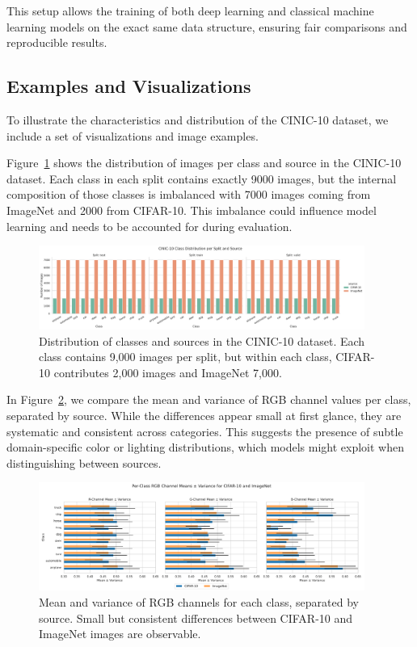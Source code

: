 This setup allows the training of both deep learning and classical machine learning models on the exact same data structure, ensuring fair 
comparisons and reproducible results.

\subsection{Examples and Visualizations}
\label{subsec:Examples and Visualizations}

To illustrate the characteristics and distribution of the CINIC-10 dataset, we include a set of visualizations and image examples.

Figure~\ref{fig:class-distribution} shows the distribution of images per class and source in the 
CINIC-10 dataset. Each class in each split contains exactly 9000 images, but the internal composition of those classes is imbalanced with 7000
images coming from ImageNet and 2000 from CIFAR-10. This imbalance could influence model learning and needs to be accounted for during 
evaluation.

\begin{figure}[H]
    \centering
    \includegraphics[width=0.95\textwidth]{Plots/DatasetOverview/cinic10_class_distribution.pdf}
    \caption{Distribution of classes and sources in the CINIC-10 dataset. Each class contains 9,000 images per split, but within each class, CIFAR-10 contributes 2,000 images and ImageNet 7,000.}
    \label{fig:class-distribution}
\end{figure}

In Figure~\ref{fig:rgb-stats}, we compare the mean and variance of RGB channel values per class, 
separated by source. While the differences appear small at first glance, they are systematic and consistent across categories. This suggests the 
presence of subtle domain-specific color or lighting distributions, which models might exploit when distinguishing between sources.

\begin{figure}[H]
    \centering
    \includegraphics[width=0.95\textwidth]{Plots/DatasetOverview/rgb_means_variance_per_class.pdf}
    \caption{Mean and variance of RGB channels for each class, separated by source. Small but consistent differences between CIFAR-10 and ImageNet images are observable.}
    \label{fig:rgb-stats}
\end{figure}

